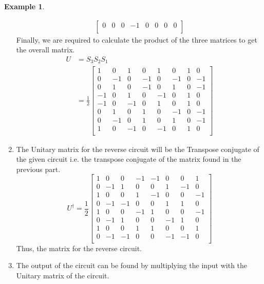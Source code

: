 \documentclass[12pt, oneside]{book}
\theoremstyle{definition}
\theoremstyle{definition}
\newtheorem{example}{Example}[section]
\theoremstyle{remark}
\begin{document}
\begin{example}
\begin{enumerate}
\begin{align*}
\begin{bmatrix}
                0 & 0 & 0 & -1 & 0 & 0 & 0 & 0 \\
            \end{bmatrix} 
        \end{align*}
        Finally, we are required to calculate the product of the three matrices to get the overall matrix.
        \begin{align*} 
            U &= S_3S_2S_1 \\
            &= \frac{1}{2}\begin{bmatrix} 
                1 & 0 & 1 & 0 & 1 & 0 & 1 & 0 \\
                0 & -1 & 0 & -1 & 0 & -1 & 0 & -1 \\
                0 & 1 & 0 & -1 & 0 & 1 & 0 & -1 \\
                -1 & 0 & 1 & 0 & -1 & 0 & 1 & 0 \\
                -1 & 0 & -1 & 0 & 1 & 0 & 1 & 0 \\
                0 & 1 & 0 & 1 & 0 & -1 & 0 & -1 \\
                0 & -1 & 0 & 1 & 0 & 1 & 0 & -1 \\
                1 & 0 & -1 & 0 & -1 & 0 & 1 & 0 \\
            \end{bmatrix}
        \end{align*}
        \item The Unitary matrix for the reverse circuit will be the Transpose conjugate of the given circuit i.e. the transpose conjugate of the matrix found in the previous part.
        \[
            U^{\dagger}=\frac{1}{2}\begin{bmatrix} 
                1 & 0 & 0 & -1 & -1 & 0 & 0 & 1 \\
                0 & -1 & 1 & 0 & 0 & 1 & -1 & 0 \\
                1 & 0 & 0 & 1 & -1 & 0 & 0 & -1 \\
                0 & -1 & -1 & 0 & 0 & 1 & 1 & 0 \\
                1 & 0 & 0 & -1 & 1 & 0 & 0 & -1 \\
                0 & -1 & 1 & 0 & 0 & -1 & 1 & 0 \\
                1 & 0 & 0 & 1 & 1 & 0 & 0 & 1 \\
                0 & -1 & -1 & 0 & 0 & -1 & -1 & 0 \\
            \end{bmatrix}
        \]
        Thus, the matrix for the reverse circuit.
        \item The output of the circuit can be found by multiplying the input with the Unitary matrix of the circuit.

\end{enumerate}
\end{example}
\end{document}
